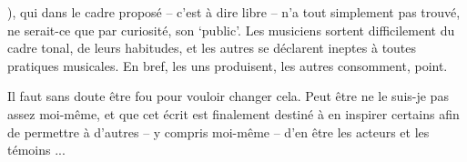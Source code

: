 \documentclass{article}
\begin{document}
), qui dans le cadre proposé -- c'est à dire libre -- n'a tout simplement pas trouvé, ne serait-ce que par curiosité, son `public'. Les musiciens sortent difficilement du cadre tonal, de leurs habitudes, et les autres se déclarent ineptes à toutes pratiques musicales. En bref, les uns produisent, les autres consomment, point. 

% 

Il faut sans doute être fou pour vouloir changer cela. Peut être ne le suis-je pas assez moi-même, et que cet écrit est finalement destiné à en inspirer certains afin de permettre à d'autres -- y compris moi-même -- d'en être les acteurs et les témoins ...

 
\end{document}
